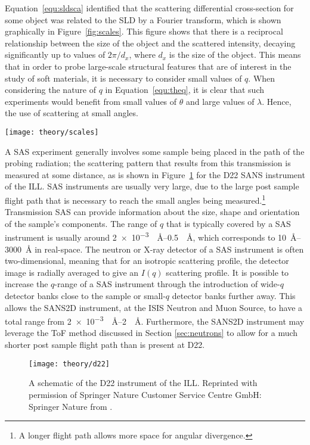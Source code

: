 Equation~\ref{equ:sldsca} identified that the scattering differential cross-section for some object was related to the SLD by a Fourier transform, which is shown graphically in Figure~\ref{fig:scales}.
This figure shows that there is a reciprocal relationship between the size of the object and the scattered intensity, decaying significantly up to values of $2\pi/d_x$, where $d_x$ is the size of the object.
This means that in order to probe large-scale structural features that are of interest in the study of soft materials, it is necessary to consider small values of $q$.
When considering the nature of $q$ in Equation~\ref{equ:theq}, it is clear that such experiments would benefit from small values of $\theta$ and large values of $\lambda$.
Hence, the use of scattering at small angles.
%
\begin{marginfigure}
    \centering
    \texttt{[image: theory/scales]}
    \caption{The effect of a Fourier transform (a) the SLD profile for some object with a width of \SI{10}{\angstrom}, (b) the Fourier transform of this object showing the minima in the differential cross section at values of $\sfrac{2n\pi}{10}$, where $n$ is some integer.}
    \label{fig:scales}
\end{marginfigure}
%

A SAS experiment generally involves some sample being placed in the path of the probing radiation; the scattering pattern that results from this transmission is measured at some distance, as is shown in Figure~\ref{fig:sasgeo} for the D22 SANS instrument of the ILL.
SAS instruments are usually very large, due to the large post sample flight path that is necessary to reach the small angles being measured.\footnote{A longer flight path allows more space for angular divergence.}
Transmission SAS can provide information about the size, shape and orientation of the sample's components.\autocite{willis_experimental_2009}
The range of $q$ that is typically covered by a SAS instrument is usually around \SIrange{2e-3}{0.5}{\per\angstrom}, which corresponds to \SIrange{10}{3000}{\angstrom} in real-space.
The neutron or X-ray detector of a SAS instrument is often two-dimensional, meaning that for an isotropic scattering profile, the detector image is radially averaged to give an $I(q)$ scattering profile.
It is possible to increase the $q$-range of a SAS instrument through the introduction of wide-$q$ detector banks close to the sample or small-$q$ detector banks further away.
This allows the SANS2D instrument, at the ISIS Neutron and Muon Source, to have a total range from \SIrange{2e-3}{2}{\per\angstrom}.\autocite{noauthor_isis_nodate}
Furthermore, the SANS2D instrument may leverage the ToF method discussed in Section \ref{sec:neutrons} to allow for a much shorter post sample flight path than is present at D22.
%
\begin{figure}[t]
    \centering
    \texttt{[image: theory/d22]}
    \caption{A schematic of the D22 instrument of the ILL. Reprinted with permission of Springer Nature Customer Service Centre GmbH: Springer Nature from \cite{grillo_small-angle_2008}.}
    \label{fig:sasgeo}
\end{figure}
%

